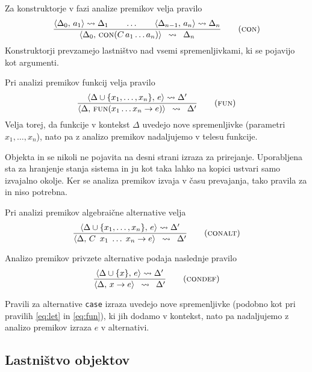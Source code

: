 Za konstruktorje  v fazi analize premikov velja pravilo
\begin{equation}
\infers[con]{
    \langle \Delta_0 , \, a_1 \rangle \leadsto \Delta_1
    \qquad
    \dots
    \qquad
    \langle \Delta_{n - 1} , \, a_n \rangle \leadsto \Delta_n
}{
    \langle \Delta_0 , \, \object{con}(C \, a_1 \dots a_n) \rangle
}{
	\Delta_n
}
\label{eq:con}
\end{equation}
Konstruktorji prevzamejo lastništvo nad vsemi spremenljivkami, ki se pojavijo kot argumenti.

Pri analizi premikov funkcij  velja pravilo
\begin{equation}
\infers[fun]{
    \langle \Delta \cup \{ x_1, \dots, x_n \} , \, e \rangle \leadsto \Delta'
}{
    \langle \Delta , \, \object{fun}(x_1 \dots x_n \to e) \rangle
}{
	\Delta'
}
\label{eq:fun}
\end{equation}
Velja torej, da funkcije v kontekst $\Delta$ uvedejo nove spremenljivke (parametri $x_1, \dots, x_n$), nato pa z analizo premikov nadaljujemo v telesu funkcije.

Objekta  in  se nikoli ne pojavita na desni strani izraza za prirejanje. Uporabljena sta za hranjenje stanja sistema in ju kot taka lahko na kopici ustvari samo izvajalno okolje. Ker se analiza premikov izvaja v času prevajanja, tako pravila za  in  niso potrebna.

Pri analizi premikov algebraične alternative velja
\begin{equation}
\infers[conalt]{
    \langle \Delta \cup \{ x_1, \dots, x_n \} , \, e \rangle \leadsto \Delta'
}{
    \langle \Delta , \, C \enspace x_1 \; \dots \; x_n \to e \rangle
}{
	\Delta'
}
\label{eq:conalt}
\end{equation}

Analizo premikov privzete alternative podaja naslednje pravilo
\begin{equation}
\infers[condef]{
    \langle \Delta \cup \{ x \} , \, e \rangle \leadsto \Delta'
}{
    \langle \Delta , \, x \to e \rangle
}{
	\Delta'
}
\label{eq:condef}
\end{equation}

Pravili za alternative \texttt{case} izraza uvedejo nove spremenljivke (podobno kot pri pravilih \ref{eq:let} in \ref{eq:fun}), ki jih dodamo v kontekst, nato pa nadaljujemo z analizo premikov izraza $e$ v alternativi.

\subsection{Lastništvo objektov}

